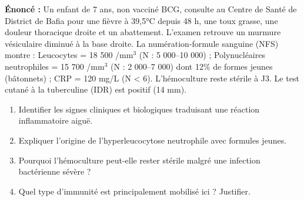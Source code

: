 \documentclass[11pt]{article}
\begin{document}
\begin{exoresolu}
\textbf{Énoncé :} Un enfant de 7 ans, non vacciné BCG, consulte au Centre de Santé de District de Bafia pour une fièvre à 39,5°C depuis 48 h, une toux grasse, une douleur thoracique droite et un abattement. L'examen retrouve un murmure vésiculaire diminué à la base droite. La numération-formule sanguine (NFS) montre : Leucocytes = 18 500 /mm$^3$ (N : 5 000--10 000) ; Polynucléaires neutrophiles = 15 700 /mm$^3$ (N : 2 000--7 000) dont 12\% de formes jeunes (bâtonnets) ; CRP = 120 mg/L (N < 6). L'hémoculture reste stérile à J3. Le test cutané à la tuberculine (IDR) est positif (14 mm).

\begin{enumerate}
\item Identifier les signes cliniques et biologiques traduisant une réaction inflammatoire aiguë.
\item Expliquer l'origine de l'hyperleucocytose neutrophile avec formules jeunes.
\item Pourquoi l'hémoculture peut-elle rester stérile malgré une infection bactérienne sévère ?
\item Quel type d'immunité est principalement mobilisé ici ? Justifier.
\end{enumerate}


\end{exoresolu}
\end{document}
